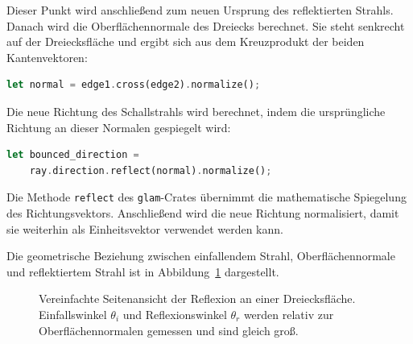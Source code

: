 Dieser Punkt wird anschließend zum neuen Ursprung des reflektierten Strahls.
Danach wird die Oberflächennormale des Dreiecks berechnet. Sie steht senkrecht
auf der Dreiecksfläche und ergibt sich aus dem Kreuzprodukt der beiden
Kantenvektoren:

\begin{lstlisting}[language=Rust]
let normal = edge1.cross(edge2).normalize();
\end{lstlisting}

Die neue Richtung des Schallstrahls wird berechnet, indem die ursprüngliche
Richtung an dieser Normalen gespiegelt wird:

\begin{lstlisting}[language=Rust]
let bounced_direction =
    ray.direction.reflect(normal).normalize();
\end{lstlisting}

Die Methode \texttt{reflect} des \texttt{glam}-Crates übernimmt die
mathematische Spiegelung des Richtungsvektors. Anschließend wird die neue
Richtung normalisiert, damit sie weiterhin als Einheitsvektor verwendet werden
kann.

Die geometrische Beziehung zwischen einfallendem Strahl,
Oberflächennormale und reflektiertem Strahl ist in
Abbildung~\ref{fig:reflection_side_view} dargestellt.

\begin{figure}[htbp]
    \centering
    \caption{Vereinfachte Seitenansicht der Reflexion an einer Dreiecksfläche. Einfallswinkel \(\theta_i\) und Reflexionswinkel \(\theta_r\) werden relativ zur Oberflächennormalen gemessen und sind gleich groß.}
    \label{fig:reflection_side_view}
\end{figure}

